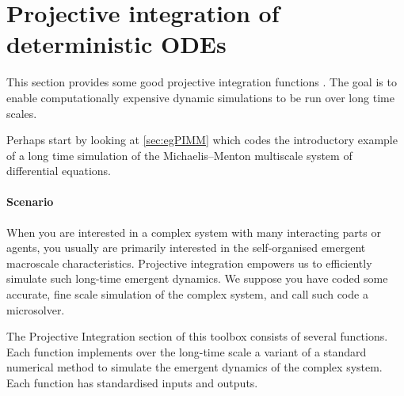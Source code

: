 \section{Projective integration of deterministic ODEs}
\label{sec:ProjInt}
\localtableofcontents

This section provides some good projective integration functions \cite[e.g.]{Gear02b, Gear03c, Givon06, Sieber2018}.
The goal is to enable computationally expensive dynamic simulations to be run over long time scales.
\begin{userMan} 
Perhaps start by looking at \cref{sec:egPIMM} which codes the introductory example of a long time simulation of the Michaelis--Menton multiscale system of differential equations.
\end{userMan}

\paragraph{Scenario}
When you are interested in a complex system with many interacting parts or agents, you usually are primarily interested in the self-organised emergent macroscale characteristics.
Projective integration empowers us to efficiently simulate such long-time emergent dynamics.
We suppose you have coded some accurate, fine scale simulation of the complex system, and call such code a microsolver.

The Projective Integration section of this toolbox consists of several functions.
Each function implements over the long-time scale a variant of a standard numerical method to simulate the emergent dynamics of the complex system.
Each function has standardised inputs and outputs.



